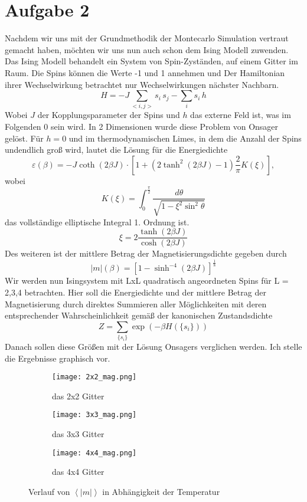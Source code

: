 \documentclass[12pt]{article}
\begin{document}
\section*{Aufgabe 2}
Nachdem wir uns mit der Grundmethodik der Montecarlo Simulation vertraut gemacht haben, möchten wir uns nun auch schon dem Ising Modell zuwenden. Das Ising Modell behandelt ein System von Spin-Zyständen, auf einem Gitter im Raum. Die Spins können die Werte -1 und 1 annehmen und Der Hamiltonian ihrer Wechselwirkung betrachtet nur Wechselwirkungen nächster Nachbarn.
$$H=-J\sum_{<i,j>}s_i\,s_j-\sum_is_i\,h$$
Wobei $J$ der Kopplungsparameter der Spins und $h$ das externe Feld ist, was im Folgenden 0 sein wird. In 2 Dimensionen wurde diese Problem von Onsager gelöst. Für $h=0$ und im thermodynamischen Limes, in dem die Anzahl der Spins undendlich groß wird, lautet die Lösung für die Energiedichte
$$\varepsilon(\beta)=-J\coth(2\beta{J})\cdot\left[1+(2\tanh^2(2\beta{J})-1)\frac{2}{\pi}K(\xi)\right],$$
wobei
$$K(\xi)=\int_0^{\frac{\pi}{2}}\frac{d\theta}{\sqrt{1-\xi^2\sin^2\theta}}$$
das vollständige elliptische Integral 1. Ordnung ist.
$$\xi=2\frac{\tanh(2\beta{J})}{\cosh(2\beta{J})}$$
Des weiteren ist der mittlere Betrag der Magnetisierungsdichte gegeben durch
$$|m|(\beta)=\left[1-\sinh^{-4}(2\beta{J})\right]^{\frac{1}{8}}$$
Wir werden nun Isingsystem mit LxL quadratisch angeordneten Spins für L = 2,3,4 betrachten. Hier soll die Energiedichte und der mittlere Betrag der Magnetisierung durch direktes Summieren aller Möglichkeiten mit deren entsprechender Wahrscheinlichkeit gemäß der kanonischen Zustandsdichte
$$Z=\sum_{\{s_i\}}\exp(-\beta{H(\{s_i\})})$$
Danach sollen diese Größen mit der Lösung Onsagers verglichen werden. Ich stelle die Ergebnisse graphisch vor.
\begin{figure}[H]\hspace*{-1.5cm}
    \begin{subfigure}{0.4\textwidth}
    \texttt{[image: 2x2\_mag.png]}
    \caption{das 2x2 Gitter}
    \end{subfigure}
    \hfill
    \begin{subfigure}{0.4\textwidth}
    \hspace*{-0.8cm}
    \texttt{[image: 3x3\_mag.png]}
    \caption{das 3x3 Gitter}
    \end{subfigure}
    \hfill
    \hspace*{-1.5cm}
    \begin{subfigure}{0.4\textwidth}
    \texttt{[image: 4x4\_mag.png]}
    \caption{das 4x4 Gitter}
    \end{subfigure}
    \hfill
    \caption{Verlauf von $\left\langle|m|\right\rangle$ in Abhängigkeit der Temperatur}
    \end{figure}
\end{document}
